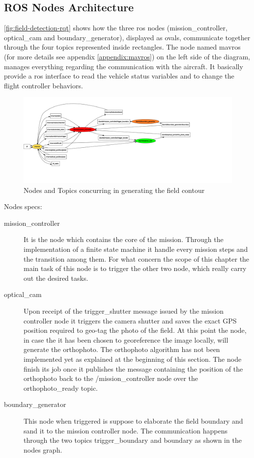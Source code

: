 \subsection{ROS Nodes Architecture} %
\label{sub:ros_nodes}
\autoref{fig:field-detection-rqt} shows how the three \acrshort{ros} nodes (\textsf{mission\_controller}, \textsf{optical\_cam} and \textsf{boundary\_generator}), displayed as ovals, communicate together through the four topics represented inside rectangles. The node named \textsf{mavros} (for more details see appendix \ref{appendix:mavros}) on the left side of the diagram, manages everything regarding the communication with the aircraft. It basically provide a \acrshort{ros} interface to read the vehicle status variables and to change the flight controller behaviors.\par
\begin{figure}[ht]
    \centering
    \includegraphics[width=1.3\textwidth]{figures/C2/fieldDetection-rqt_graph.pdf}
    \caption{Nodes and Topics concurring in generating the field contour}
    \label{fig:field-detection-rqt}
\end{figure}
Nodes specs:
\begin{description}
	\item[\textsf{mission\_controller}] It is the node which contains the core of the mission. Through the implementation of a finite state machine it handle every mission steps and the transition among them. For what concern the scope of this chapter the main task of this node is to trigger the other two node, which really carry out the desired tasks.
	\item[\textsf{optical\_cam}] Upon receipt of the \textsf{trigger\_shutter} message issued by the mission controller node it triggers the camera shutter and saves the exact GPS position required to geo-tag the photo of the field.
	At this point the node, in case the it has been chosen to georeference the image locally, will generate the orthophoto. The orthophoto algorithm has not been implemented yet as explained at the beginning of this section.
	The node finish its job once it publishes the message containing the position of the orthophoto back to the \textsf{/mission\_controller} node over the \textsf{orthophoto\_ready} topic. 
	\item[\textsf{boundary\_generator}] This node when triggered is suppose to elaborate the field boundary and sand it to the mission controller node. The communication happens through the two topics \textsf{trigger\_boundary} and \textsf{boundary} as shown in the nodes graph.
\end{description}
